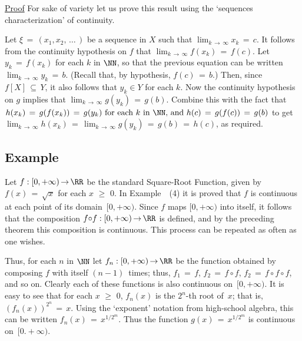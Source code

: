         \underline{Proof} For sake of variety let us prove this result using the `sequences characterization' of continuity.

\V

    Let ${\xi} \,=\, (x_{1},x_{2},\,{\ldots}\,)$ be a sequence in $X$ such that $\lim_{k \,{\rightarrow}\, {\infty}} x_{k} \,=\, c$.
    It follows from the continuity hypothesis on $f$ that $\lim_{k \,{\rightarrow}\, {\infty}} f(x_{k}) \,=\, f(c)$.
    Let $y_{k} \,=\, f(x_{k})$ for each $k$ in ${\NN}$, so that the previous equation can be written $\lim_{k \,{\rightarrow}\, {\infty}} y_{k} \,=\, b$.
    (Recall that, by hypothesis, $f(c) \,=\, b$.)
    Then, since $f[X] \,{\subseteq}\, Y$, it also follows that $y_{k}{\in}Y$ for each $k$.
    Now the continuity hypothesis on $g$ implies that $\lim_{k \,{\rightarrow}\, {\infty}} g(y_{k}) \,=\, g(b)$.
    Combine this with the fact that $h(x_{k}) \,=\, g(f(x_{k})) \,=\, g(y_{k}) \mbox{ for each $k$ in ${\NN}$, and } h(c) \,=\, g(f(c)) \,=\, g(b)$
    to get $\lim_{k \,{\rightarrow}\, {\infty}} h(x_{k})  \,=\, \lim_{k \,{\rightarrow}\, {\infty}} g(y_{k}) \,=\, g(b) \,=\, h(c)$, as required.

\VV


            \subsection{\small{\bf Example}}
            \label{ExampD20.80}
\V

        Let $f:[0,+{\infty}) \,{\rightarrow}\, {\RR}$ be the standard Square-Root Function, given by $f(x) \,=\, \sqrt{x}$ for each $x\,\,{\geq}\,\,0$.
    In Example~~(4) it is proved that $f$ is continuous at each point of its domain~$[0,+{\infty})$.
    Since $f$ maps $[0,+{\infty})$ into itself, it follows that the composition $f{\circ}f:[0,+{\infty}) \,{\rightarrow}\, {\RR}$ is defined,
    and by the preceding theorem this composition is continuous. This process can be repeated as often as one wishes.

        Thus, for each $n$ in ${\NN}$ let $f_{n}:[0,+{\infty}) \,{\rightarrow}\, {\RR}$ be the function obtained by composing
    $f$ with itself $(n-1)$~times; thus, $f_{1} \,=\, f$, $f_{2} \,=\, f{\circ}f$, $f_{2} \,=\, f{\circ}f{\circ}f$, and so on.
    Clearly each of these functions is also continuous on~$[0,+{\infty})$. It is easy to see that for each $x\,\,{\geq}\,\,0$,
    $f_{n}(x)$ is the $2^{n}$-th root of~$x$; that is, $\left(f_{n}(x)\right)^{2^{n}} \,=\, x$.
    Using the `exponent' notation from high-school algebra, this can be written $f_{n}(x) \,=\, x^{1/2^{m}}$.
    Thus the function $g(x) \,=\, x^{1/2^{m}}$ is continuous on~$[0.+{\infty})$.

